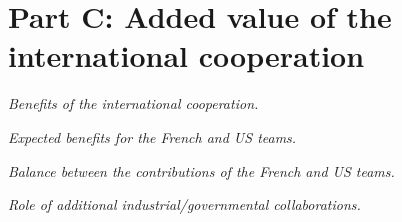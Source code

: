 \section{Part C: Added value of the international cooperation}

\textit{Benefits of the international cooperation.}


\textit{Expected benefits for the French and US teams.} 

\textit{Balance between the contributions of the French and US teams.}

\textit{Role of additional industrial/governmental collaborations.}




\clearpage


